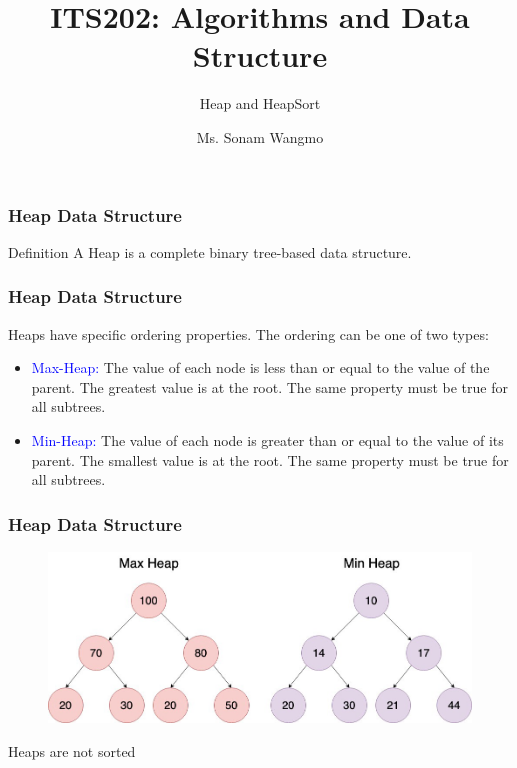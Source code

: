 \documentclass[11pt]{beamer}
\begin{document}
	\author{Ms. Sonam Wangmo}
	\title{ITS202: Algorithms and Data Structure}
	\subtitle{Heap and HeapSort}
	\institute{
		\textcolor{blue}{Gyalpozhing College of Information Technology \\ Royal University of Bhutan} \\
		\vspace{0.5cm}
	}
	\begin{frame}[plain]
		\maketitle
	\end{frame}

  \begin{frame}
 	\frametitle	{Heap Data Structure} 
		 \begin{block}{Definition}
		A Heap is a complete binary tree-based data structure.
		 \end{block}
 \end{frame}

 \begin{frame}
	\frametitle	{Heap Data Structure} 
	Heaps have specific ordering properties. The ordering can be one of two types:
	\begin{itemize}
		\item \textcolor{blue}{Max-Heap:} The value of each node is less than or equal to the value of the parent. The greatest value is at the root. The same property must be true for all subtrees.
		\item \textcolor{blue}{Min-Heap:} The value of each node is greater than or equal to the value of its parent. The smallest value is at the root. The same property must be true for all subtrees.
	\end{itemize}
\end{frame}

 \begin{frame}
	\frametitle	{Heap Data Structure} 
	\begin{figure}
		\centering
		\includegraphics[width=1\linewidth]{1*EU964HO0LZyypp7_MLkY8A}
		\label{fig:1eu964ho0lzyypp7mlky8a}
	\end{figure}
	\alert{Heaps are not sorted}
\end{frame}
\end{document}
